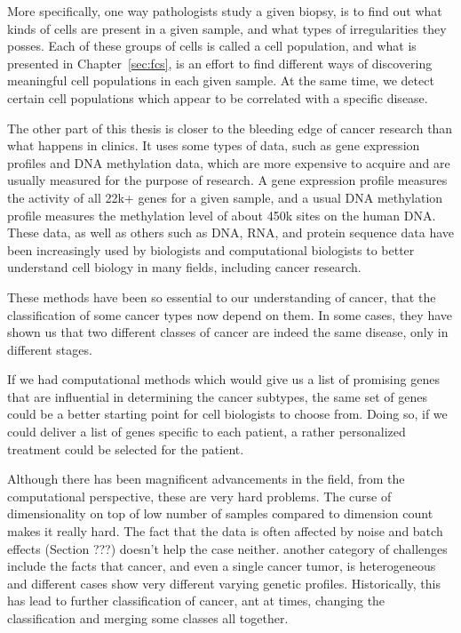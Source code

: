 More specifically, one way pathologists study a given biopsy, is to find out
what kinds of cells are present in a given sample, and what types of
irregularities they posses. Each of these groups of cells is called a cell
population, and what is presented in Chapter~\ref{sec:fcs}, is an effort to find
different ways of discovering meaningful cell populations in each given sample.
At the same time, we detect certain cell populations which appear to be
correlated with a specific disease.

The other part of this thesis is closer to the bleeding edge of cancer research
than what happens in clinics. It uses some types of data, such as gene
expression profiles and DNA methylation data, which are more expensive to
acquire and are usually measured for the purpose of research. A gene expression
profile measures the activity of all 22k+ genes for a given sample, and a usual
DNA methylation profile measures the methylation level of about 450k sites on
the human DNA. These data, as well as others such as DNA, RNA, and protein
sequence data have been increasingly used by biologists and computational
biologists to better understand cell biology in many fields, including cancer
research.

These methods have been so essential to our understanding of cancer, that the
classification of some cancer types now depend on them. In some cases, they have
shown us that two different classes of cancer are indeed the same disease, only
in different stages.

If we had computational methods which would give us a list of promising genes
that are influential in determining the cancer subtypes, the same set of genes
could be a better starting point for cell biologists to choose from. Doing so,
if we could deliver a list of genes specific to each patient, a rather
personalized treatment could be selected for the patient.

Although there has been magnificent advancements in the field, from the
computational perspective, these are very hard problems. The curse of
dimensionality on top of low number of samples compared to dimension count makes
it really hard. The fact that the data is often affected by noise and batch
effects (Section ???) doesn't help the case neither. another category of
challenges include the facts that cancer, and even a single cancer tumor, is
heterogeneous and different cases show very different varying genetic profiles.
Historically, this has lead to further classification of cancer, ant at times,
changing the classification and merging some classes all together.

